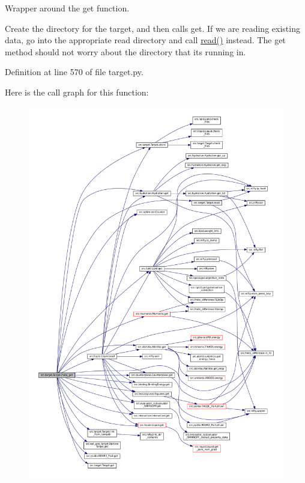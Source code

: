 Wrapper around the get function. 

Create the directory for the target, and then calls \textquotesingle{}get\textquotesingle{}. If we are reading existing data, go into the appropriate read directory and call \hyperlink{classsrc_1_1target_1_1Target_ae3ca02da2e52ece9a6f8d48203cc245e}{read()} instead. The \textquotesingle{}get\textquotesingle{} method should not worry about the directory that it\textquotesingle{}s running in. 

Definition at line 570 of file target.\+py.

Here is the call graph for this function\+:
\nopagebreak
\begin{figure}[H]
\begin{center}
\leavevmode
\includegraphics[width=350pt]{classsrc_1_1target_1_1Target_a14ccb9a63ebc92a83ead58965f13fcc7_cgraph}
\end{center}
\end{figure}
\mbox{\label{classsrc_1_1target_1_1Target_a75dc5c4428df625f265e481f61718ec1}} 
